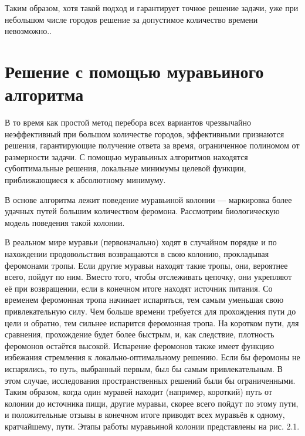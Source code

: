 \documentclass[12pt]{report}
\begin{document}
Таким образом, хотя такой подход и гарантирует точное решение задачи, уже при небольшом числе городов решение за допустимое количество времени невозможно.\cite{Brute}. 	

\section{Решение с помощью муравьиного алгоритма}
В то время как простой метод перебора всех вариантов чрезвычайно неэффективный при большом количестве городов, эффективными признаются решения, гарантирующие получение ответа за время, ограниченное полиномом от размерности задачи. С помощью муравьиных алгоритмов находятся субоптимальные решения, локальные минимумы целевой функции, приближающиеся к абсолютному минимуму\cite{AntAlg}.

В основе алгоритма лежит поведение муравьиной колонии — маркировка более удачных путей большим количеством феромона. Рассмотрим биологическую модель поведения такой колонии.

В реальном мире муравьи (первоначально) ходят в случайном порядке и по нахождении продовольствия возвращаются в свою колонию, прокладывая феромонами тропы. Если другие муравьи находят такие тропы, они, вероятнее всего, пойдут по ним. Вместо того, чтобы отслеживать цепочку, они укрепляют её при возвращении, если в конечном итоге находят источник питания. Со временем феромонная тропа начинает испаряться, тем самым уменьшая свою привлекательную силу. Чем больше времени требуется для прохождения пути до цели и обратно, тем сильнее испарится феромонная тропа. На коротком пути, для сравнения, прохождение будет более быстрым, и, как следствие, плотность феромонов остаётся высокой. Испарение феромонов также имеет функцию избежания стремления к локально-оптимальному решению. Если бы феромоны не испарялись, то путь, выбранный первым, был бы самым привлекательным. В этом случае, исследования пространственных решений были бы ограниченными. Таким образом, когда один муравей находит (например, короткий) путь от колонии до источника пищи, другие муравьи, скорее всего пойдут по этому пути, и положительные отзывы в конечном итоге приводят всех муравьёв к одному, кратчайшему, пути. Этапы работы муравьиной колонии представлены на рис. 2.1.
\end{document}
